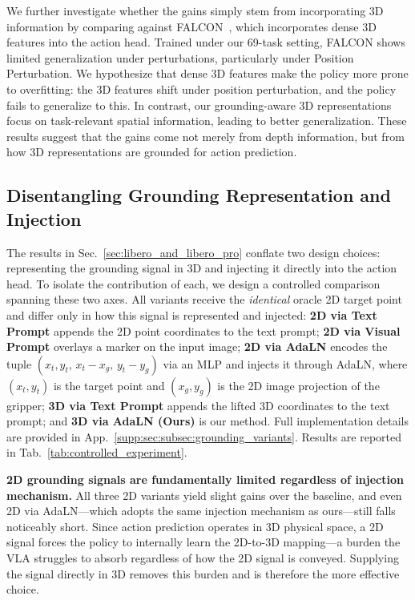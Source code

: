 We further investigate whether the gains simply stem from incorporating 3D information by comparing against FALCON~\cite{falcon}, which incorporates dense 3D features into the action head. Trained under our 69-task setting, FALCON shows limited generalization under perturbations, particularly under Position Perturbation. We hypothesize that dense 3D features make the policy more prone to overfitting: the 3D features shift under position perturbation, and the policy fails to generalize to this. In contrast, our grounding-aware 3D representations focus on task-relevant spatial information, leading to better generalization. These results suggest that the gains come not merely from depth information, but from how 3D representations are grounded for action prediction.


\subsection{Disentangling Grounding Representation and Injection}
\label{sec:grounding_rep_inj}

The results in Sec.~\ref{sec:libero_and_libero_pro} conflate two design choices: representing the grounding signal in 3D and injecting it directly into the action head. To isolate the contribution of each, we design a controlled comparison spanning these two axes. All variants receive the \emph{identical} oracle 2D target point and differ only in how this signal is represented and injected: \textbf{2D via Text Prompt} appends the 2D point coordinates to the text prompt; \textbf{2D via Visual Prompt} overlays a marker on the input image; \textbf{2D via AdaLN} encodes the tuple $(x_t, y_t,\, x_t - x_g,\, y_t - y_g)$ via an MLP and injects it through AdaLN, where $(x_t, y_t)$ is the target point and $(x_g, y_g)$ is the 2D image projection of the gripper; \textbf{3D via Text Prompt} appends the lifted 3D coordinates to the text prompt; and \textbf{3D via AdaLN (Ours)} is our method. Full implementation details are provided in App.~\ref{supp:sec:subsec:grounding_variants}. Results are reported in Tab.~\ref{tab:controlled_experiment}.

\textbf{2D grounding signals are fundamentally limited regardless of injection mechanism.} All three 2D variants yield slight gains over the baseline, and even 2D via AdaLN—which adopts the same injection mechanism as ours—still falls noticeably short. Since action prediction operates in 3D physical space, a 2D signal forces the policy to internally learn the 2D-to-3D mapping—a burden the VLA struggles to absorb regardless of how the 2D signal is conveyed. Supplying the signal directly in 3D removes this burden and is therefore the more effective choice.

